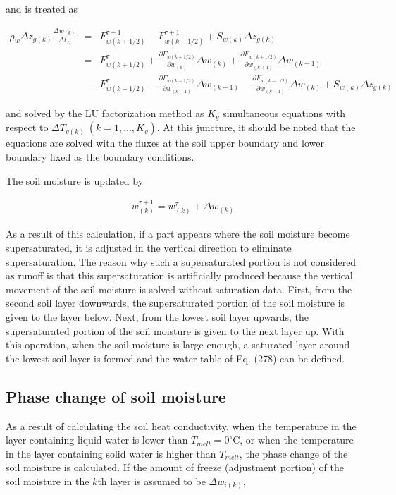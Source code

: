 and \hyperref[eq299]{} is treated as

\begin{eqnarray}
\rho_w \Delta z_{g(k)} \frac{\Delta w_{(k)}}{\Delta t_L}
&=& F_{w(k+1/2)}^{\tau+1} - {F}_{w(k-1/2)}^{\tau+1} + S_{w(k)} \Delta z_{g(k)} \nonumber\\
&=& {F}_{w(k+1/2)}^{\tau}
+\frac{\partial F_{w(k+1/2)}}{\partial w_{(k)}}
 \Delta w_{(k)}
+\frac{\partial F_{w(k+1/2)}}{\partial w_{(k+1)}}
 \Delta w_{(k+1)}  \\
&-& F_{w(k-1/2)}^{\tau}
-\frac{\partial F_{w(k-1/2)}}{\partial w_{(k-1)}}
 \Delta w_{(k-1)}
-\frac{\partial F_{w(k-1/2)}}{\partial w_{(k-1)}}
 \Delta w_{(k)} + S_{w(k)} \Delta z_{g(k)}  \nonumber
\end{eqnarray}

and solved by the LU factorization method as \(K_g\) simultaneous equations with respect to \(\Delta T_{g(k)}\ (k=1,\ldots,K_{g})\). At this juncture, it should be noted that the equations are solved
with the fluxes at the soil upper boundary and lower boundary fixed as the boundary conditions.

The soil moisture is updated by

\begin{eqnarray}
 w_{(k)}^{\tau+1} = w_{(k)}^{\tau} + \Delta w_{(k)}
\end{eqnarray}

As a result of this calculation, if a part appears where the soil moisture become supersaturated, it is adjusted in the vertical direction to eliminate supersaturation. The reason why such a
supersaturated portion is not considered as runoff is that this supersaturation is artificially produced because the vertical movement of the soil moisture is solved without saturation data. First,
from the second soil layer downwards, the supersaturated portion of the soil moisture is given to the layer below. Next, from the lowest soil layer upwards, the supersaturated portion of the soil
moisture is given to the next layer up. With this operation, when the soil moisture is large enough, a saturated layer around the lowest soil layer is formed and the water table of Eq. (278) can be
defined.

\subsection{Phase change of soil moisture}\label{phase-change-of-soil-moisture}

As a result of calculating the soil heat conductivity, when the temperature in the layer containing liquid water is lower than \(T_{melt}=0 ^{\circ}\)C, or when the temperature in the layer containing
solid water is higher than \(T_{melt}\), the phase change of the soil moisture is calculated. If the amount of freeze (adjustment portion) of the soil moisture in the \(k\)th layer is assumed to be
\(\Delta w_{i(k)}\),

